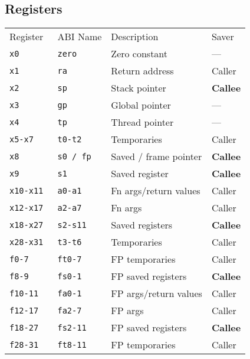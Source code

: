 \subsection{Registers}\label{registers}

\begin{footnotesize}
    \renewcommand{\arraystretch}{1.2}
    \begin{tabularx}{\linewidth}{@{}llll@{}}
        Register     & ABI Name     & Description           & Saver           \\
        \cmidrule{1-4}
        \tt{x0}      & \tt{zero}    & Zero constant         & ---             \\
        \tt{x1}      & \tt{ra}      & Return address        & Caller          \\
        \tt{x2}      & \tt{sp}      & Stack pointer         & \textbf{Callee} \\
        \tt{x3}      & \tt{gp}      & Global pointer        & ---             \\
        \tt{x4}      & \tt{tp}      & Thread pointer        & ---             \\
        \tt{x5-x7}   & \tt{t0-t2}   & Temporaries           & Caller          \\
        \tt{x8}      & \tt{s0 / fp} & Saved / frame pointer & \textbf{Callee} \\
        \tt{x9}      & \tt{s1}      & Saved register        & \textbf{Callee} \\
        \tt{x10-x11} & \tt{a0-a1}   & Fn args/return values & Caller          \\
        \tt{x12-x17} & \tt{a2-a7}   & Fn args               & Caller          \\
        \tt{x18-x27} & \tt{s2-s11}  & Saved registers       & \textbf{Callee} \\
        \tt{x28-x31} & \tt{t3-t6}   & Temporaries           & Caller          \\
        \cmidrule{1-4}
        \tt{f0-7}    & \tt{ft0-7}   & FP temporaries        & Caller          \\
        \tt{f8-9}    & \tt{fs0-1}   & FP saved registers    & \textbf{Callee} \\
        \tt{f10-11}  & \tt{fa0-1}   & FP args/return values & Caller          \\
        \tt{f12-17}  & \tt{fa2-7}   & FP args               & Caller          \\
        \tt{f18-27}  & \tt{fs2-11}  & FP saved registers    & \textbf{Callee} \\
        \tt{f28-31}  & \tt{ft8-11}  & FP temporaries        & Caller          \\
    \end{tabularx}
    \renewcommand{\arraystretch}{1}
\end{footnotesize}